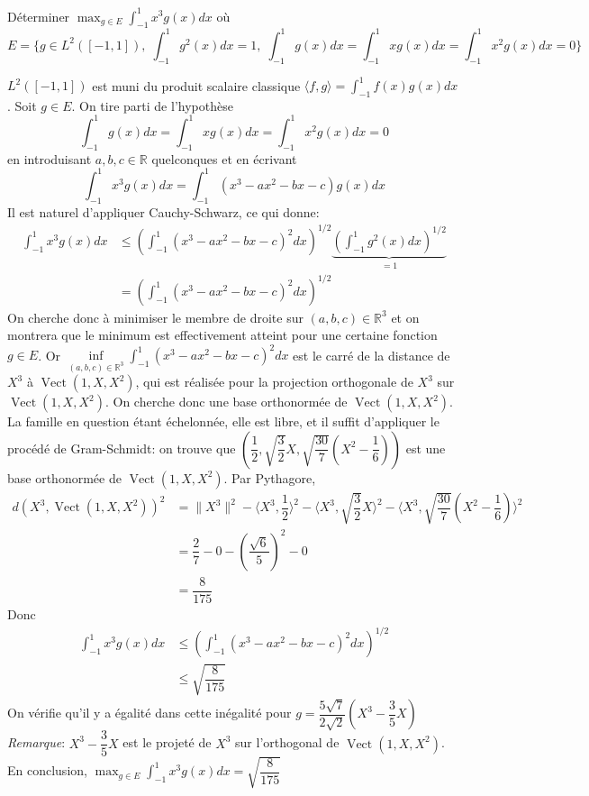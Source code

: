 \documentclass{fancybook}
\DeclareMathOperator{\Vect}{Vect}
\begin{document}
\begin{exercice}
Déterminer $\displaystyle \max_{g\in E} \int_{-1}^1 x^3g(x) dx$ où $$E=\Big \{g\in L^2([-1,1]),\; \int_{-1}^1 g^2(x) dx =1,\; \int_{-1}^1 g(x) dx = \int_{-1}^1 xg(x) dx = \int_{-1}^1 x^2g(x) dx =0  \Big \}$$
\end{exercice}
$L^2([-1,1])$ est muni du produit scalaire classique $\langle f,g\rangle = \int_{-1}^{1} f(x)g(x) dx$.\newline
 Soit $g\in E$. On tire parti de l'hypothèse $$\int_{-1}^1 g(x) dx = \int_{-1}^1 xg(x) dx = \int_{-1}^1 x^2g(x) dx =0$$ en introduisant $a,b,c\in \mathbb R$ quelconques et en écrivant $$\int_{-1}^1 x^3g(x) dx = \int_{-1}^1 (x^3-ax^2-bx-c)g(x) dx $$ 
Il est naturel d'appliquer Cauchy-Schwarz, ce qui donne: $$\begin{aligned}\int_{-1}^1 x^3g(x) dx &\leq \left(\int_{-1}^1 (x^3-ax^2-bx-c)^2 dx\right)^{1/2}\underbrace{\left(\int_{-1}^1 g^2(x) dx\right)^{1/2}}_{=1} \\ &= \left(\int_{-1}^1 (x^3-ax^2-bx-c)^2 dx\right)^{1/2}\end{aligned}$$
On cherche donc à minimiser le membre de droite sur $(a,b,c)\in \mathbb R^3$ et on montrera que le minimum est effectivement atteint pour une certaine fonction $g\in E$.\newline
\newline 
Or $\inf \limits_{(a,b,c)\in \mathbb R^3} \int_{-1}^1 (x^3-ax^2-bx-c)^2 dx$ est le carré de la distance de $X^3$ à $\Vect(1,X,X^2)$, qui est réalisée pour la projection orthogonale de $X^3$ sur $\Vect(1,X,X^2)$. On cherche donc une base orthonormée de $\Vect(1,X,X^2)$. La famille en question étant échelonnée, elle est libre, et il suffit d'appliquer le procédé de Gram-Schmidt: on trouve que $\left(\dfrac 12, \sqrt{\dfrac 32}X, \sqrt{\dfrac{30}{7}}\left(X^2-\dfrac 16 \right)\right)$ est une base orthonormée de $\Vect(1,X,X^2)$.\newline
Par Pythagore, $$\begin{aligned} d(X^3,\Vect(1,X,X^2))^2 &=\Big\|X^3\Big\|^2-\Big\langle X^3, \dfrac 12 \Big\rangle ^2 - \Big\langle X^3, \sqrt{\dfrac 32}X \Big\rangle ^2 - \Big\langle X^3, \sqrt{\dfrac{30}{7}}\left(X^2-\dfrac 16 \right) \Big\rangle ^2 \\
&= \dfrac 27 - 0 - \left( \dfrac{\sqrt 6}{5}\right)^2 -0\\
&= \dfrac{8}{175} \end{aligned}$$ 
Donc $$\begin{aligned}\int_{-1}^1 x^3g(x) dx &\leq  \left(\int_{-1}^1 (x^3-ax^2-bx-c)^2 dx\right)^{1/2} \\
&\leq \sqrt{\dfrac{8}{175}}
\end{aligned}$$
On vérifie qu'il y a égalité dans cette inégalité pour $\displaystyle g = \dfrac{5\sqrt 7}{2\sqrt 2}\left(X^3-\dfrac 35 X \right)$ \newline
\textit{Remarque}: $X^3-\dfrac 35 X$ est le projeté de $X^3$ sur l'orthogonal de $\Vect(1,X,X^2)$.\newline 
\newline
En conclusion, $\displaystyle \max_{g\in E} \int_{-1}^1 x^3g(x) dx=\sqrt{\dfrac{8}{175}}$
\end{document}
